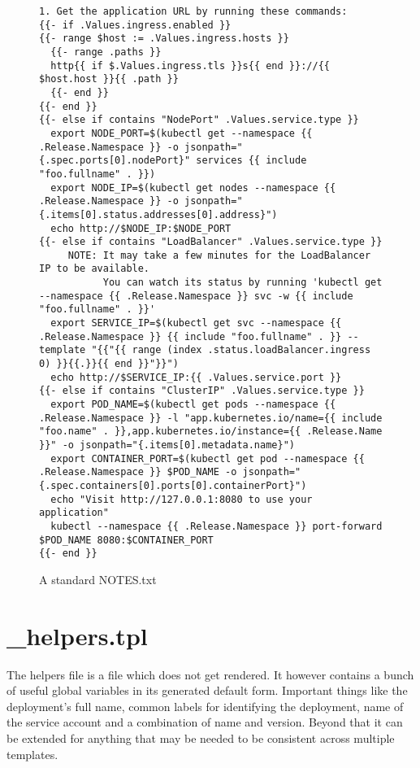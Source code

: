\begin{figure}[h]
\begin{verbatim}
1. Get the application URL by running these commands:
{{- if .Values.ingress.enabled }}
{{- range $host := .Values.ingress.hosts }}
  {{- range .paths }}
  http{{ if $.Values.ingress.tls }}s{{ end }}://{{ $host.host }}{{ .path }}
  {{- end }}
{{- end }}
{{- else if contains "NodePort" .Values.service.type }}
  export NODE_PORT=$(kubectl get --namespace {{ .Release.Namespace }} -o jsonpath="{.spec.ports[0].nodePort}" services {{ include "foo.fullname" . }})
  export NODE_IP=$(kubectl get nodes --namespace {{ .Release.Namespace }} -o jsonpath="{.items[0].status.addresses[0].address}")
  echo http://$NODE_IP:$NODE_PORT
{{- else if contains "LoadBalancer" .Values.service.type }}
     NOTE: It may take a few minutes for the LoadBalancer IP to be available.
           You can watch its status by running 'kubectl get --namespace {{ .Release.Namespace }} svc -w {{ include "foo.fullname" . }}'
  export SERVICE_IP=$(kubectl get svc --namespace {{ .Release.Namespace }} {{ include "foo.fullname" . }} --template "{{"{{ range (index .status.loadBalancer.ingress 0) }}{{.}}{{ end }}"}}")
  echo http://$SERVICE_IP:{{ .Values.service.port }}
{{- else if contains "ClusterIP" .Values.service.type }}
  export POD_NAME=$(kubectl get pods --namespace {{ .Release.Namespace }} -l "app.kubernetes.io/name={{ include "foo.name" . }},app.kubernetes.io/instance={{ .Release.Name }}" -o jsonpath="{.items[0].metadata.name}")
  export CONTAINER_PORT=$(kubectl get pod --namespace {{ .Release.Namespace }} $POD_NAME -o jsonpath="{.spec.containers[0].ports[0].containerPort}")
  echo "Visit http://127.0.0.1:8080 to use your application"
  kubectl --namespace {{ .Release.Namespace }} port-forward $POD_NAME 8080:$CONTAINER_PORT
{{- end }}
\end{verbatim}
\caption{A standard NOTES.txt}\label{code:NOTES.txt}
\end{figure}

\section{\_helpers.tpl}

The helpers file is a file which does not get rendered.
It however contains a bunch of useful global variables in its generated default form.
Important things like the deployment's full name, common labels for identifying the deployment, name of the service account and a combination of name and version.
Beyond that it can be extended for anything that may be needed to be consistent across multiple templates.